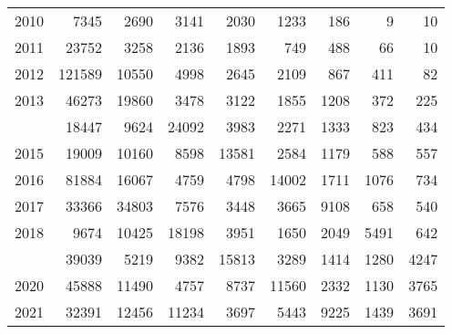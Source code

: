 \documentclass[
]{article}
\begin{document}
\begin{longtable}[t]{lrrrrrrrr}
2010 & 7345 & 2690 & 3141 & 2030 & 1233 & 186 & 9 & 10\\
2011 & 23752 & 3258 & 2136 & 1893 & 749 & 488 & 66 & 10\\
2012 & 121589 & 10550 & 4998 & 2645 & 2109 & 867 & 411 & 82\\
2013 & 46273 & 19860 & 3478 & 3122 & 1855 & 1208 & 372 & 225\\
\addlinespace
2014 & 18447 & 9624 & 24092 & 3983 & 2271 & 1333 & 823 & 434\\
2015 & 19009 & 10160 & 8598 & 13581 & 2584 & 1179 & 588 & 557\\
2016 & 81884 & 16067 & 4759 & 4798 & 14002 & 1711 & 1076 & 734\\
2017 & 33366 & 34803 & 7576 & 3448 & 3665 & 9108 & 658 & 540\\
2018 & 9674 & 10425 & 18198 & 3951 & 1650 & 2049 & 5491 & 642\\
\addlinespace
2019 & 39039 & 5219 & 9382 & 15813 & 3289 & 1414 & 1280 & 4247\\
2020 & 45888 & 11490 & 4757 & 8737 & 11560 & 2332 & 1130 & 3765\\
2021 & 32391 & 12456 & 11234 & 3697 & 5443 & 9225 & 1439 & 3691\\*
\end{longtable}
\end{document}
